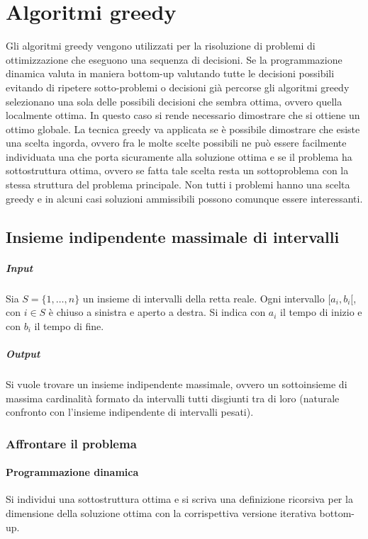 \chapter{Algoritmi greedy}
Gli algoritmi greedy vengono utilizzati per la risoluzione di problemi di ottimizzazione che eseguono una sequenza di decisioni. Se la programmazione dinamica valuta in maniera bottom-up
valutando tutte le decisioni possibili evitando di ripetere sotto-problemi o decisioni gi\`a percorse gli algoritmi greedy selezionano una sola delle possibili decisioni che sembra
ottima, ovvero quella localmente ottima. In questo caso si rende necessario dimostrare che si ottiene un ottimo globale. La tecnica greedy va applicata se \`e possibile dimostrare che 
esiste una scelta ingorda, ovvero fra le molte scelte possibili ne pu\`o essere facilmente individuata una che porta sicuramente alla soluzione ottima e se il problema ha sottostruttura
ottima, ovvero se fatta tale scelta resta un sottoproblema con la stessa struttura del problema principale. Non tutti i problemi hanno una scelta greedy e in alcuni casi soluzioni 
ammissibili possono comunque essere interessanti.
\section{Insieme indipendente massimale di intervalli}
\paragraph{Input}
Sia $S=\{1, \dots, n\}$ un insieme di intervalli della retta reale. Ogni intervallo $[a_i, b_i[$, con $i\in S$ \`e chiuso a sinistra e aperto a destra. Si indica con $a_i$ il tempo di
inizio e con $b_i$ il tempo di fine. 
\paragraph{Output}
Si vuole trovare un insieme indipendente massimale, ovvero un sottoinsieme di massima cardinalit\`a formato da intervalli tutti disgiunti tra di loro (naturale confronto con l'insieme
indipendente di intervalli pesati).
\subsection{Affrontare il problema}
\subsubsection{Programmazione dinamica}
Si individui una sottostruttura ottima e si scriva una definizione ricorsiva per la dimensione della soluzione ottima con la corrispettiva versione iterativa bottom-up.
